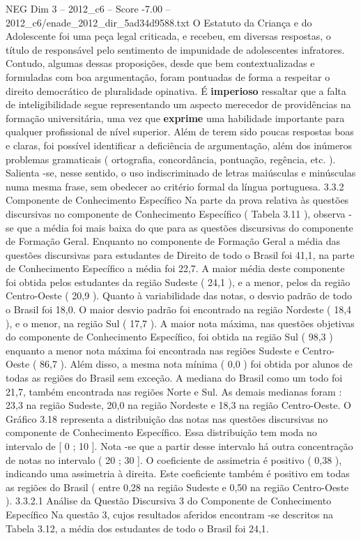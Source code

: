 \begin{textsample}{NEG Dim 3 – 2012\_c6 – Score -7.00 – 2012\_c6/enade\_2012\_dir\_5ad34d9588.txt}
O Estatuto da Criança e do Adolescente foi uma peça legal criticada, e recebeu, em diversas respostas, o título de responsável pelo sentimento de impunidade de adolescentes infratores.
Contudo, algumas dessas proposições, desde que bem contextualizadas e formuladas com boa argumentação, foram pontuadas de forma a respeitar o direito democrático de pluralidade opinativa.
É \textbf{imperioso} ressaltar que a falta de inteligibilidade segue representando um aspecto merecedor de providências na formação universitária, uma vez que \textbf{exprime} uma habilidade importante para qualquer profissional de nível superior.
Além de terem sido poucas respostas boas e claras, foi possível identificar a deficiência de argumentação, além dos inúmeros problemas gramaticais ( ortografia, concordância, pontuação, regência, etc. ).
Salienta -se, nesse sentido, o uso indiscriminado de letras maiúsculas e minúsculas numa mesma frase, sem obedecer ao critério formal da língua portuguesa. 3.3.2 Componente de Conhecimento Específico Na parte da prova relativa às questões discursivas no componente de Conhecimento Específico ( Tabela 3.11 ), observa -se que a média foi mais baixa do que para as questões discursivas do componente de Formação Geral.
Enquanto no componente de Formação Geral a média das questões discursivas para estudantes de Direito de todo o Brasil foi 41,1, na parte de Conhecimento Específico a média foi 22,7.
A maior média deste componente foi obtida pelos estudantes da região Sudeste ( 24,1 ), e a menor, pelos da região Centro-Oeste ( 20,9 ).
Quanto à variabilidade das notas, o desvio padrão de todo o Brasil foi 18,0.
O maior desvio padrão foi encontrado na região Nordeste ( 18,4 ), e o menor, na região Sul ( 17,7 ).
A maior nota máxima, nas questões objetivas do componente de Conhecimento Específico, foi obtida na região Sul ( 98,3 ) enquanto a menor nota máxima foi encontrada nas regiões Sudeste e Centro-Oeste ( 86,7 ).
Além disso, a mesma nota mínima ( 0,0 ) foi obtida por alunos de todas as regiões do Brasil sem exceção.
A mediana do Brasil como um todo foi 21,7, também encontrada nas regiões Norte e Sul.
As demais medianas foram : 23,3 na região Sudeste, 20,0 na região Nordeste e 18,3 na região Centro-Oeste.
O Gráfico 3.18 representa a distribuição das notas nas questões discursivas no componente de Conhecimento Específico.
Essa distribuição tem moda no intervalo de [ 0 ; 10 ].
Nota -se que a partir desse intervalo há outra concentração de notas no intervalo ( 20 ; 30 ].
O coeficiente de assimetria é positivo ( 0,38 ), indicando uma assimetria à direita.
Este coeficiente também é positivo em todas as regiões do Brasil ( entre 0,28 na região Sudeste e 0,50 na região Centro-Oeste ). 3.3.2.1 Análise da Questão Discursiva 3 do Componente de Conhecimento Específico Na questão 3, cujos resultados aferidos encontram -se descritos na Tabela 3.12, a média dos estudantes de todo o Brasil foi 24,1.

\end{textsample}
